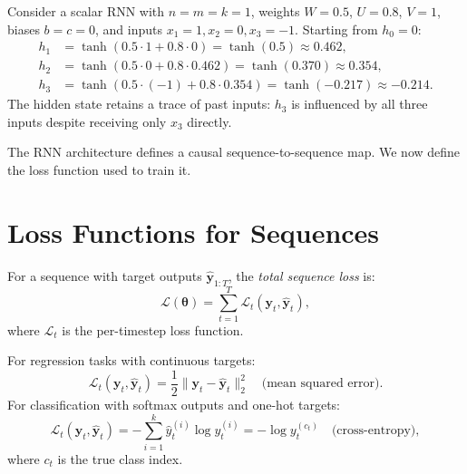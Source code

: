 \documentclass[11pt,a4paper]{article}
\begin{document}
\begin{example}
\label{ex:simple-rnn}
Consider a scalar RNN with $n = m = k = 1$, weights $W = 0.5$,
$U = 0.8$, $V = 1$, biases $b = c = 0$, and inputs
$x_1 = 1, x_2 = 0, x_3 = -1$.  Starting from $h_0 = 0$:
\begin{align*}
  h_1 &= \tanh(0.5 \cdot 1 + 0.8 \cdot 0) = \tanh(0.5) \approx 0.462, \\
  h_2 &= \tanh(0.5 \cdot 0 + 0.8 \cdot 0.462) = \tanh(0.370)
    \approx 0.354, \\
  h_3 &= \tanh(0.5 \cdot (-1) + 0.8 \cdot 0.354) = \tanh(-0.217)
    \approx -0.214.
\end{align*}
The hidden state retains a trace of past inputs: $h_3$ is influenced
by all three inputs despite receiving only $x_3$ directly.
\end{example}

The RNN architecture defines a causal sequence-to-sequence map.
We now define the loss function used to train it.

\section{Loss Functions for Sequences}
\label{sec:loss}

\begin{definition}
\label{def:seq-loss}
For a sequence with target outputs $\hat{\mathbf{y}}_{1:T}$, the
\emph{total sequence loss} is:
\begin{equation}
  \mathcal{L}(\boldsymbol{\theta}) = \sum_{t=1}^{T}
    \mathcal{L}_t(\mathbf{y}_t, \hat{\mathbf{y}}_t),
  \label{eq:seq-loss}
\end{equation}
where $\mathcal{L}_t$ is the per-timestep loss function.
\end{definition}

\begin{definition}
\label{def:common-losses}
For regression tasks with continuous targets:
\[
  \mathcal{L}_t(\mathbf{y}_t, \hat{\mathbf{y}}_t)
    = \frac{1}{2} \|\mathbf{y}_t - \hat{\mathbf{y}}_t\|_2^2
    \quad \text{(mean squared error)}.
\]
For classification with softmax outputs and one-hot targets:
\[
  \mathcal{L}_t(\mathbf{y}_t, \hat{\mathbf{y}}_t)
    = -\sum_{i=1}^{k} \hat{y}_t^{(i)} \log y_t^{(i)}
    = -\log y_t^{(c_t)}
    \quad \text{(cross-entropy)},
\]
where $c_t$ is the true class index.
\end{definition}
\end{document}
